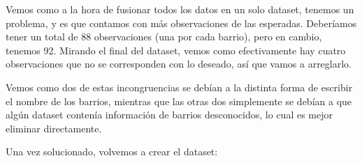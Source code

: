 \documentclass[notspecified,article,submit,moreauthors,pdftex]{Definitions/mdpi}
\newenvironment{Shaded}{\begin{snugshade}}{\end{snugshade}}
\newcommand{\CommentTok}[1]{\textcolor[rgb]{0.56,0.35,0.01}{\textit{#1}}}
\newcommand{\DecValTok}[1]{\textcolor[rgb]{0.00,0.00,0.81}{#1}}
\newcommand{\FunctionTok}[1]{\textcolor[rgb]{0.13,0.29,0.53}{\textbf{#1}}}
\newcommand{\NormalTok}[1]{#1}
\newcommand{\OtherTok}[1]{\textcolor[rgb]{0.56,0.35,0.01}{#1}}
\newcommand{\SpecialCharTok}[1]{\textcolor[rgb]{0.81,0.36,0.00}{\textbf{#1}}}
\newcommand{\StringTok}[1]{\textcolor[rgb]{0.31,0.60,0.02}{#1}}
\begin{document}
Vemos como a la hora de fusionar todos los datos en un solo dataset,
tenemos un problema, y es que contamos con más observaciones de las
esperadas. Deberíamos tener un total de 88 observaciones (una por cada
barrio), pero en cambio, tenemos 92. Mirando el final del dataset, vemos
como efectivamente hay cuatro observaciones que no se corresponden con
lo deseado, así que vamos a arreglarlo.

\begin{Shaded}
\end{Shaded}

Vemos como dos de estas incongruencias se debían a la distinta forma de
escribir el nombre de los barrios, mientras que las otras dos
simplemente se debían a que algún dataset contenía información de
barrios desconocidos, lo cual es mejor eliminar directamente.

Una vez solucionado, volvemos a crear el dataset:
\end{document}
